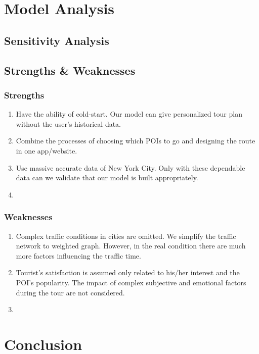 \documentclass{mcmthesis}
\begin{document}
\section{Model Analysis}
\subsection{Sensitivity Analysis}

\subsection{Strengths \& Weaknesses}
\subsubsection{Strengths}
  \begin{enumerate}
    \item Have the ability of cold-start. Our model can give personalized tour plan without the user's historical data.
    \item Combine the processes of choosing which POIs to go and designing the route in one app/website.
    \item Use massive accurate data of New York City. Only with these dependable data can we validate that our model is built appropriately.
    \item 
  \end{enumerate}
\subsubsection{Weaknesses}
  \begin{enumerate}
    \item Complex traffic conditions in cities are omitted. We simplify the traffic network to weighted graph. However, in the real condition there are much more factors influencing the traffic time.
    \item Tourist's satisfaction is assumed only related to his/her interest and the POI's popularity. The impact of complex subjective and emotional factors during the tour are not considered.
    \item 
  \end{enumerate}

\section{Conclusion}
\end{document}
